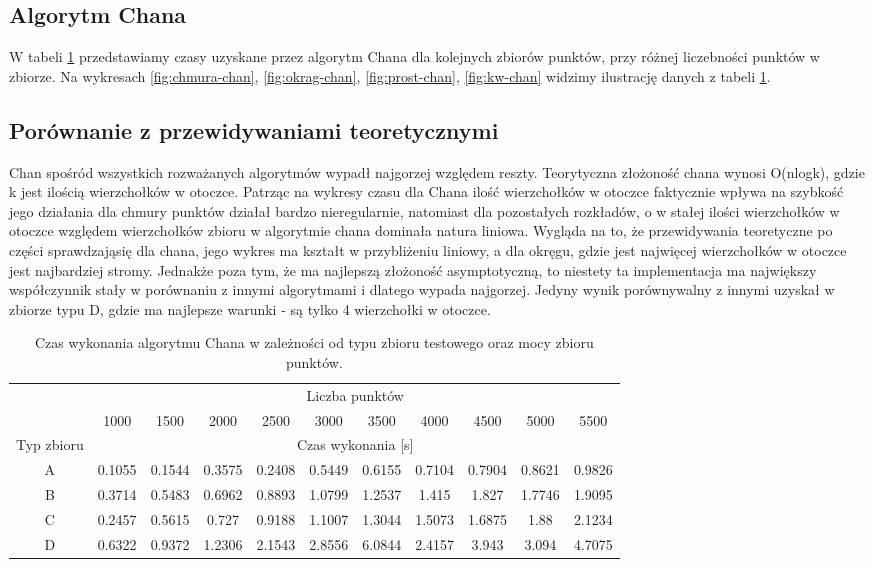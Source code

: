 \documentclass[11pt]{article}
\theoremstyle{remark} \newtheorem{definition}{def.}
\theoremstyle{definition} \newtheorem{twierdzenie}{tw.}
\begin{document}
\subsection{Algorytm Chana}

W tabeli \ref{tab:chan} przedstawiamy czasy uzyskane przez algorytm Chana dla kolejnych zbiorów punktów, przy różnej liczebności punktów w zbiorze. Na wykresach \ref{fig:chmura-chan}, 
\ref{fig:okrag-chan}, \ref{fig:prost-chan}, \ref{fig:kw-chan} widzimy ilustrację danych z tabeli \ref{tab:chan}.

\subsection{Porównanie z przewidywaniami teoretycznymi}
    Chan spośród wszystkich rozważanych algorytmów wypadł najgorzej względem reszty. Teorytyczna złożoność chana wynosi O(nlogk), gdzie k jest ilością wierzchołków w otoczce. Patrząc na wykresy czasu dla Chana
    ilość wierzchołków w otoczce faktycznie wpływa na szybkość jego działania dla chmury punktów działał bardzo nieregularnie, natomiast
    dla pozostałych rozkładów, o w stałej ilości wierzchołków w otoczce względem wierzchołków zbioru w algorytmie chana dominała natura liniowa.
    Wygląda na to, że przewidywania teoretyczne po części sprawdzająsię dla chana, jego wykres ma kształt w przybliżeniu liniowy, a dla okręgu, gdzie jest najwięcej
    wierzchołków w otoczce jest najbardziej stromy. Jednakże poza tym, że ma najlepszą złożoność asymptotyczną, to niestety ta implementacja ma największy współczynnik stały w porównaniu z innymi algorytmami 
    i dlatego wypada najgorzej. Jedyny wynik porównywalny z innymi uzyskał w zbiorze typu D, gdzie ma najlepsze warunki - są tylko 4 wierzchołki w otoczce.

\begin{table}[]
\centering
\caption{Czas wykonania algorytmu Chana w zależności od typu zbioru testowego oraz mocy zbioru punktów.}
\label{tab:chan}
\begin{tabular}{c|c|c|c|c|c|c|c|c|c|c|}
\cline{2-11}
\multicolumn{1}{l|}{} & \multicolumn{10}{c|}{Liczba punktów} \\ \cline{2-11} 
\multicolumn{1}{l|}{} & 1000 & 1500 & 2000 & 2500 & 3000 & 3500 & 4000 & 4500 & 5000 & 5500 \\ \hline
\multicolumn{1}{|c|}{Typ zbioru} & \multicolumn{10}{c|}{Czas wykonania {[}s{]}} \\ \hline
\multicolumn{1}{|c|}{A} & 0.1055 & 0.1544 & 0.3575 & 0.2408 & 0.5449 & 0.6155 & 0.7104 & 0.7904 & 0.8621 & 0.9826 \\ \hline
\multicolumn{1}{|c|}{B} & 0.3714 & 0.5483 & 0.6962 & 0.8893 & 1.0799 & 1.2537 & 1.415 & 1.827 & 1.7746 & 1.9095 \\ \hline
\multicolumn{1}{|c|}{C} & 0.2457 & 0.5615 & 0.727 & 0.9188 & 1.1007 & 1.3044 & 1.5073 & 1.6875 & 1.88 & 2.1234 \\ \hline
\multicolumn{1}{|c|}{D} & 0.6322 & 0.9372 & 1.2306 & 2.1543 & 2.8556 & 6.0844 & 2.4157 & 3.943 & 3.094 & 4.7075 \\ \hline
\end{tabular}
\end{table}
\end{document}

